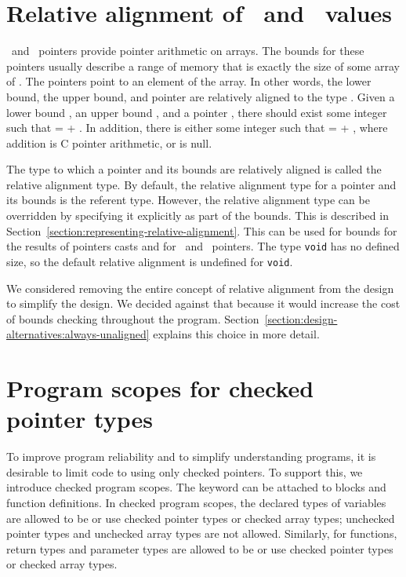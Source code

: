 \section{Relative alignment of \arrayptr\ and \spanptr\ values}
\label{section:relative-alignment}

\arrayptrT\ and \spanptrT\ pointers provide
pointer arithmetic on arrays. The bounds for these pointers usually
describe a range of memory that is exactly the size of some array of .
The pointers point to an element of the array. In other words, the lower
bound, the upper bound, and pointer are  relatively aligned to the type
. Given a lower bound , an upper bound , and a
pointer , there should exist some integer  such that
 =  + . In addition, there is either some
integer  such that  =  + ,
where addition is C pointer arithmetic, or  is null.

The type to which a pointer and its bounds are relatively aligned is
called the relative alignment type. By default, the relative alignment
type for a pointer and its bounds is the referent type. However, the
relative alignment type can be overridden by specifying it explicitly as
part of the bounds.  This is described in 
Section~\ref{section:representing-relative-alignment}.
This can be used for bounds for the results of pointers casts and 
for  \arrayptrvoid\ and \spanptrvoid\ pointers. The type
\texttt{void} has no defined size, so the default relative alignment is
undefined for \texttt{void}.

We considered removing the entire concept of relative alignment from the
design to simplify the design.  We decided against that because it would 
increase the cost of bounds checking throughout the program.  
Section~\ref{section:design-alternatives:always-unaligned} explains
this choice in more detail.

\section{Program scopes for checked pointer types}

To improve program reliability and to simplify understanding programs,
it is desirable to limit code to using only checked pointers. To support
this, we introduce checked program scopes. The  keyword
can be attached to blocks and function definitions. In checked program
scopes, the declared types of variables are allowed to be or use
checked pointer types or checked array types; unchecked pointer types
and unchecked array types are not allowed.  Similarly, for functions,
return types and parameter types are allowed to be or use checked pointer
types or checked array types.  


